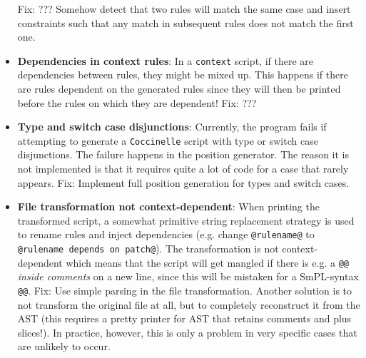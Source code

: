 \begin{itemize}
Fix: ??? Somehow detect that two rules will match the same case and insert constraints such that any match in subsequent rules does not match the first one.
\item \textbf{Dependencies in context rules}: In a \texttt{context} script, if there are dependencies between rules, they might be mixed up. This happens if there are rules dependent on the generated rules since they will then be printed before the rules on which they are dependent!\newline
Fix: ???
\item \textbf{Type and switch case disjunctions}: Currently, the program fails if attempting to generate a \texttt{Coccinelle} script with type or switch case disjunctions. The failure happens in the position generator. The reason it is not implemented is that it requires quite a lot of code for a case that rarely appears.\newline
Fix: Implement full position generation for types and switch cases.
\item \textbf{File transformation not context-dependent}: When printing the transformed script, a somewhat primitive string replacement strategy is used to rename rules and inject dependencies (e.g. change \texttt{@rulename@} to \texttt{@rulename depends on patch@}). The transformation is not context-dependent which means that the script will get mangled if there is e.g. a \texttt{@@} \textit{inside comments} on a new line, since this will be mistaken for a SmPL-syntax \texttt{@@}.\newline
Fix: Use simple parsing in the file transformation. Another solution is to not transform the original file at all, but to completely reconstruct it from the AST (this requires a pretty printer for AST that retains comments and plus slices!). In practice, however, this is only a problem in very specific cases that are unlikely to occur.
\end{itemize}
